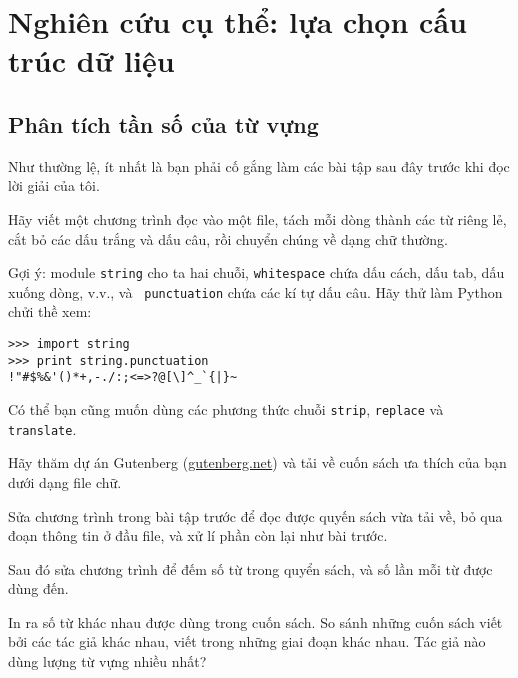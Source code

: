 \documentclass[11pt]{book}
\begin{document}




\chapter{Nghiên cứu cụ thể: lựa chọn cấu trúc dữ liệu}

\section{Phân tích tần số của từ vựng}
\label{analysis}

Như thường lệ, ít nhất là bạn phải cố gắng làm các bài tập sau đây
trước khi đọc lời giải của tôi.

\begin{ex}
Hãy viết một chương trình đọc vào một file, tách mỗi dòng thành các từ
riêng lẻ, cắt bỏ các dấu trắng và dấu câu, rồi chuyển chúng về
dạng chữ thường.


Gợi ý: module {\tt string} cho ta hai chuỗi, {\tt whitespace}
chứa dấu cách, dấu tab, dấu xuống dòng, v.v., và {\tt
  punctuation} chứa các kí tự dấu câu.  Hãy thử làm Python 
chửi thề xem:

\beforeverb
\begin{verbatim}
>>> import string
>>> print string.punctuation
!"#$%&'()*+,-./:;<=>?@[\]^_`{|}~
\end{verbatim}
\afterverb
%
Có thể bạn cũng muốn dùng các phương thức chuỗi {\tt strip},
{\tt replace} và {\tt translate}.


\end{ex}


\begin{ex}


Hãy thăm dự án Gutenberg (\url{gutenberg.net}) và tải về
cuốn sách ưa thích của bạn dưới dạng file chữ.


Sửa chương trình trong bài tập trước để đọc được quyến sách vừa
tải về, bỏ qua đoạn thông tin ở đầu file, và xử lí phần còn lại
như bài trước.

Sau đó sửa chương trình để đếm số từ trong quyển sách, và số
lần mỗi từ được dùng đến.


In ra số từ khác nhau được dùng trong cuốn sách. So sánh những
cuốn sách viết bởi các tác giả khác nhau, viết trong những giai đoạn
khác nhau. Tác giả nào dùng lượng từ vựng nhiều nhất?
\end{ex}
\end{document}
